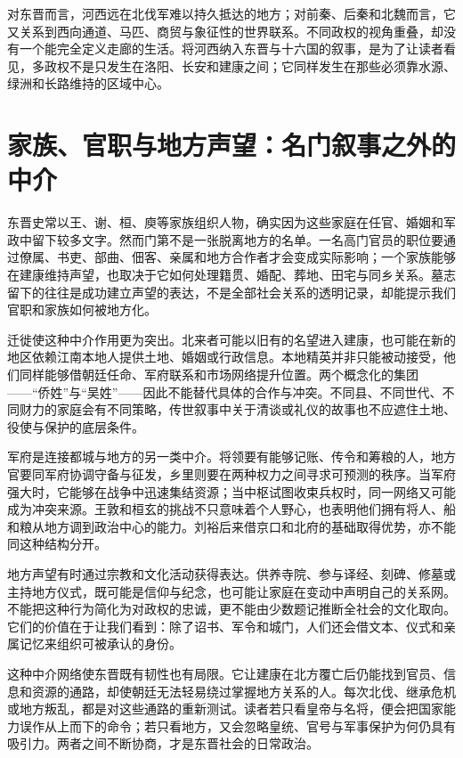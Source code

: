 对东晋而言，河西远在北伐军难以持久抵达的地方；对前秦、后秦和北魏而言，它又关系到西向通道、马匹、商贸与象征性的世界联系。不同政权的视角重叠，却没有一个能完全定义走廊的生活。将河西纳入东晋与十六国的叙事，是为了让读者看见，多政权不是只发生在洛阳、长安和建康之间；它同样发生在那些必须靠水源、绿洲和长路维持的区域中心。

\section{家族、官职与地方声望：名门叙事之外的中介}
\label{sec:eastern-jin-depth-local-intermediaries}

东晋史常以王、谢、桓、庾等家族组织人物，确实因为这些家庭在任官、婚姻和军政中留下较多文字。然而门第不是一张脱离地方的名单。一名高门官员的职位要通过僚属、书吏、部曲、佃客、亲属和地方合作者才会变成实际影响；一个家族能够在建康维持声望，也取决于它如何处理籍贯、婚配、葬地、田宅与同乡关系。墓志留下的往往是成功建立声望的表达，不是全部社会关系的透明记录，却能提示我们官职和家族如何被地方化。

迁徙使这种中介作用更为突出。北来者可能以旧有的名望进入建康，也可能在新的地区依赖江南本地人提供土地、婚姻或行政信息。本地精英并非只能被动接受，他们同样能够借朝廷任命、军府联系和市场网络提升位置。两个概念化的集团——“侨姓”与“吴姓”——因此不能替代具体的合作与冲突。不同县、不同世代、不同财力的家庭会有不同策略，传世叙事中关于清谈或礼仪的故事也不应遮住土地、役使与保护的底层条件。

军府是连接都城与地方的另一类中介。将领要有能够记账、传令和筹粮的人，地方官要同军府协调守备与征发，乡里则要在两种权力之间寻求可预测的秩序。当军府强大时，它能够在战争中迅速集结资源；当中枢试图收束兵权时，同一网络又可能成为冲突来源。王敦和桓玄的挑战不只意味着个人野心，也表明他们拥有将人、船和粮从地方调到政治中心的能力。刘裕后来借京口和北府的基础取得优势，亦不能同这种结构分开。

地方声望有时通过宗教和文化活动获得表达。供养寺院、参与译经、刻碑、修墓或主持地方仪式，既可能是信仰与纪念，也可能让家庭在变动中声明自己的关系网。不能把这种行为简化为对政权的忠诚，更不能由少数题记推断全社会的文化取向。它们的价值在于让我们看到：除了诏书、军令和城门，人们还会借文本、仪式和亲属记忆来组织可被承认的身份。

这种中介网络使东晋既有韧性也有局限。它让建康在北方覆亡后仍能找到官员、信息和资源的通路，却使朝廷无法轻易绕过掌握地方关系的人。每次北伐、继承危机或地方叛乱，都是对这些通路的重新测试。读者若只看皇帝与名将，便会把国家能力误作从上而下的命令；若只看地方，又会忽略皇统、官号与军事保护为何仍具有吸引力。两者之间不断协商，才是东晋社会的日常政治。

